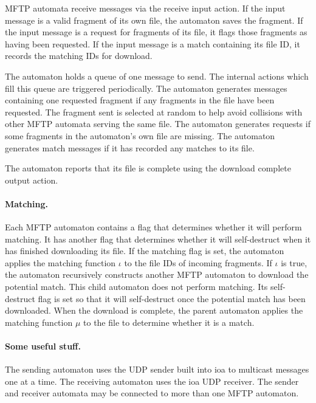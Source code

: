 \documentclass[letterpaper]{article}
\begin{document}

MFTP automata receive messages via the receive input action.
If the input message is a valid fragment of its own file, the automaton saves the fragment.
If the input message is a request for fragments of its file, it flags those fragments as having been requested.
If the input message is a match containing its file ID, it records the matching IDs for download.

The automaton holds a queue of one message to send. 
The internal actions which fill this queue are triggered periodically.
The automaton generates messages containing one requested fragment if any fragments in the file have been requested.
The fragment sent is selected at random to help avoid collisions with other MFTP automata serving the same file.
The automaton generates requests if some fragments in the automaton's own file are missing.
The automaton generates match messages if it has recorded any matches to its file.

The automaton reports that its file is complete using the download complete output action.

\paragraph{Matching.}
Each MFTP automaton contains a flag that determines whether it will perform matching. 
It has another flag that determines whether it will self-destruct when it has finished downloading its file.
If the matching flag is set, the automaton applies the matching function $\iota$ to the file IDs of incoming fragments.
If $\iota$ is true, the automaton recursively constructs another MFTP automaton to download the potential match.
This child automaton does not perform matching.  
Its self-destruct flag is set so that it will self-destruct once the potential match has been downloaded.
When the download is complete, the parent automaton applies the matching function $\mu$ to the file to determine whether it is a match.

\paragraph{Some useful stuff.} %
The sending automaton uses the UDP sender built into ioa to multicast messages one at a time.
The receiving automaton uses the ioa UDP receiver.
The sender and receiver automata may be connected to more than one MFTP automaton.
\end{document}
